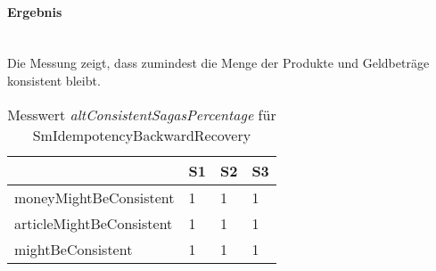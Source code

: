 \paragraph*{Ergebnis} \mbox{}\\
Die Messung zeigt, dass zumindest die Menge der Produkte und Geldbeträge konsistent bleibt.

\begin{center}
	\fontsize{9}{12}\selectfont
	\begin{longtable}[h]{|p{4cm}|p{1cm}|p{1cm}|p{1cm}|}
		\hline
		 & S1 & S2 & S3 \\ \hline
		\endhead
		\caption{Messwert \textit{altConsistentSagasPercentage} für SmIdempotencyBackwardRecovery}
		\label{tab:smbasic_stateanalysisresult}
		\endfoot
		moneyMightBeConsistent & 1 & 1 & 1 \\ \hline	
		articleMightBeConsistent & 1 & 1 & 1 \\ \hline
		mightBeConsistent & 1 & 1 & 1 \\ \hline
	\end{longtable}
\end{center}
\FloatBarrier
